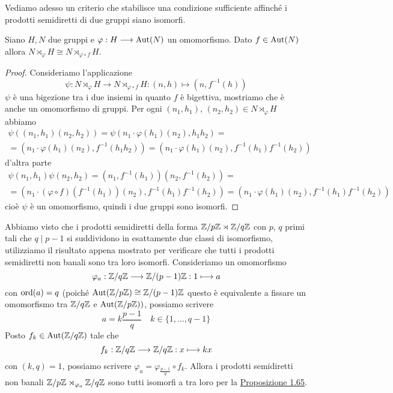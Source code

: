 \documentclass[11pt]{scrartcl}
\begin{document}
Vediamo adesso un criterio che stabilisce una condizione sufficiente affinché 
i prodotti semidiretti di due gruppi siano isomorfi.

\begin{proposition}
    \label{prop4.0}
    Siano $H, N$ due gruppi e $\varphi: H \longrightarrow \operatorname{Aut}(N)$ un omomorfismo.
    Dato $f \in \operatorname{Aut}(N)$ allora $N\rtimes_{\varphi} H \cong N\rtimes_{\varphi\circ f} H$.
\end{proposition}

\begin{proof}
    Consideriamo l'applicazione
    \[
        \psi: N\rtimes_{\varphi}H \longrightarrow N\rtimes_{\varphi\circ f}H:
        (n, h) \longmapsto (n, f^{-1}(h))
    \]
    $\psi$ è una bigezione tra i due insiemi in quanto $f$ è bigettiva,
    mostriamo che è anche un omomorfismo di gruppi. Per ogni $(n_1, h_1)$, $(n_2, h_2)
    \in N\rtimes_{\varphi}H$ abbiamo
    \begin{multline*}
        \psi((n_1, h_1)(n_2, h_2)) = \psi(n_1\cdot\varphi(h_1)(n_2), h_1h_2) = \\
        = (n_1\cdot\varphi(h_1)(n_2), f^{-1}(h_1h_2)) = (n_1\cdot\varphi(h_1)(n_2), f^{-1}(h_1)f^{-1}(h_2))
    \end{multline*}
    d'altra parte
    \begin{multline*}
        \psi(n_1, h_1)\psi(n_2, h_2) = (n_1, f^{-1}(h_1))(n_2, f^{-1}(h_2)) =\\
        = (n_1\cdot(\varphi\circ f)(f^{-1}(h_1))(n_2), f^{-1}(h_1)f^{-1}(h_2)) = 
        (n_1\cdot \varphi(h_1)(n_2), f^{-1}(h_1)f^{-1}(h_2))
    \end{multline*}
    cioè $\psi$ è un omomorfismo, quindi i due gruppi sono isomorfi.
\end{proof}

\begin{example}
    Abbiamo visto che i prodotti semidiretti della forma ${\mathbb Z}/p{\mathbb Z} \rtimes\mathbb{Z}/{q}\mathbb{Z}$
    con $p$, $q$ primi tali che $q \mid p - 1$ si suddividono in esattamente
    due classi di isomorfismo, utilizziamo il risultato appena mostrato 
    per verificare che tutti i prodotti semidiretti non banali sono tra loro 
    isomorfi. Consideriamo un omomorfismo
    \[
        \varphi_a: \mathbb{Z}/{q}\mathbb{Z}\longrightarrow \mathbb{Z}/{(p - 1)}\mathbb{Z} : 1 \longmapsto a
    \]
    con $\operatorname{ord}(a) = q$ (poiché $\operatorname{Aut}({\mathbb Z}/p{\mathbb Z}) \cong \mathbb{Z}/{(p - 1)}\mathbb{Z}$
    questo è equivalente a fissare un omomorfismo tra $\mathbb{Z}/{q}\mathbb{Z}$ e $\operatorname{Aut}({\mathbb Z}/p{\mathbb Z}))$,
    possiamo scrivere 
    \[
        a = k\frac{p - 1}{q}\quad k \in \{1, \ldots, q - 1\}
    \]
    Posto $f_k \in \operatorname{Aut}(\mathbb{Z}/{q}\mathbb{Z})$ tale che
    \[
        f_k :\mathbb{Z}/{q}\mathbb{Z}\longrightarrow\mathbb{Z}/{q}\mathbb{Z}: x \longmapsto kx
    \]
    con $(k, q) = 1$, possiamo scrivere 
    $\varphi_a = \varphi_{\frac{p - 1}{q}}\circ f_k$. Allora i prodotti
    semidiretti non banali ${\mathbb Z}/p{\mathbb Z}\rtimes_{\varphi_a}\mathbb{Z}/{q}\mathbb{Z}$ sono tutti isomorfi
    a tra loro per la \hyperref[prop4.0]{Proposizione 1.65}.
\end{example}
\end{document}

